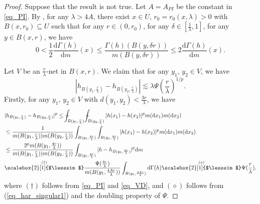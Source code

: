 \documentclass[11pt,a4paper]{article}
\numberwithin{equation}{section}
\def\Xint#1{\mathchoice
{\XXint\displaystyle\textstyle{#1}}%
{\XXint\textstyle\scriptstyle{#1}}%
{\XXint\scriptstyle\scriptscriptstyle{#1}}%
{\XXint\scriptscriptstyle\scriptscriptstyle{#1}}%
\!\int}
\def\XXint#1#2#3{{\setbox0=\hbox{$#1{#2#3}{\int}$ }
\vcenter{\hbox{$#2#3$ }}\kern-.6\wd0}}
\def\dashint{\Xint-}
\theoremstyle{plain}
\theoremstyle{definition}
\begin{document}
\begin{proof}
Suppose that the result is not true. Let $A=A_{PI}$ be the constant in \ref{eq_PI}. By \cite[LEMMA 3.1]{KM20}, for any $\lambda>4A$, there exist $x\in U$, $r_0=r_0(x,\lambda)>0$ with $B(x,r_0)\subseteq U$ such that for any $r\in(0,r_0)$, for any $\delta\in[\frac{1}{\lambda},1]$, for any $y\in B(x,r)$, we have
\begin{equation}\label{eq_har_singular1}
0<\frac{1}{2}\frac{\mathrm{d}\Gamma(h)}{\mathrm{d} m}(x)\le \frac{\Gamma(h)(B(y,\delta r))}{m(B(y,\delta r))}\le 2\frac{\mathrm{d}\Gamma(h)}{\mathrm{d} m}(x).
\end{equation}

Let $V$ be an $\frac{r}{\lambda}$-net in $B(x,r)$. We claim that for any $y_1$, $y_2\in V$, we have
\begin{equation}\label{eq_har_singular2}
|h_{B(y_1,\frac{r}{\lambda})}-h_{B(y_2,\frac{r}{\lambda})}|\lesssim\lambda\Psi(\frac{r}{\lambda})^{1/p}.
\end{equation}
Firstly, for any $y_1$, $y_2\in V$ with $d(y_1,y_2)<\frac{3r}{\lambda}$, we have
\begin{align*}
&|h_{B(y_1,\frac{r}{\lambda})}-h_{B(y_2,\frac{r}{\lambda})}|^p\le\dashint_{B(y_1,\frac{r}{\lambda})}\dashint_{B(y_2,\frac{r}{\lambda})}|h(x_1)-h(x_2)|^pm(\mathrm{d} x_1)m(\mathrm{d} x_2)\\
&\le \frac{1}{m(B(y_1,\frac{r}{\lambda}))m(B(y_2,\frac{r}{\lambda}))}\int_{B(y_1,\frac{4r}{\lambda})}\int_{B(y_1,\frac{4r}{\lambda})}|h(x_1)-h(x_2)|^pm(\mathrm{d} x_1)m(\mathrm{d} x_2)\\
&\le\frac{2^pm(B(y_1,\frac{4r}{\lambda}))}{m(B(y_1,\frac{r}{\lambda}))m(B(y_2,\frac{r}{\lambda}))}\int_{B(y_1,\frac{4r}{\lambda})}|h-h_{B(y_1,\frac{4r}{\lambda})}|^p\mathrm{d} m\\
&\overset{(\dagger)}{\scalebox{2}[1]{$\lesssim$}}\frac{\Psi(\frac{4r}{\lambda})}{m(B(y_1,\frac{4Ar}{\lambda}))}\int_{B(y_1,\frac{4Ar}{\lambda})}\mathrm{d}\Gamma(h)\overset{(\diamond)}{\scalebox{2}[1]{$\lesssim$}}\Psi(\frac{r}{\lambda}),
\end{align*}
where $(\dagger)$ follows from \ref{eq_PI} and \ref{eq_VD}, and $(\diamond)$ follows from (\ref{eq_har_singular1}) and the doubling property of $\Psi$.


\end{proof}
\end{document}
